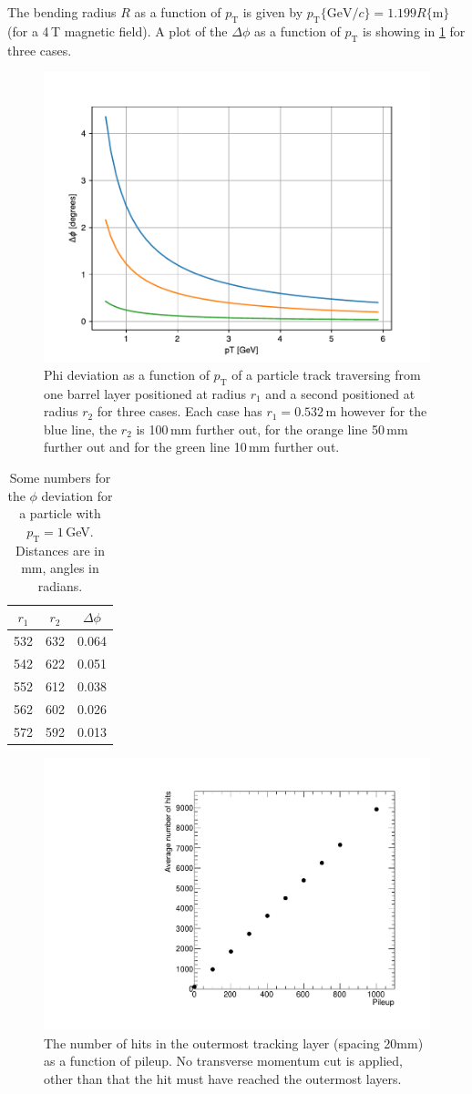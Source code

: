 \documentclass[a4paper, 12pt]{article}
\newcommand{\pt}{\ensuremath{p_{\mathrm{T}}}\xspace}
\begin{document}
The bending radius $R$ as a function of \pt is given by $\pt \{ \mathrm{GeV}/c \} = 1.199 R \{ \mathrm{m} \} $ (for a 4\,T magnetic field).
A plot of the $\Delta \phi$ as a function of \pt is showing in \cref{fig:phiDeviation} for three cases.
\begin{figure}
  \centering
  \includegraphics[width=0.7\linewidth]{images/phiDeviation.pdf}
  \caption{Phi deviation as a function of \pt of a particle track traversing from one barrel layer positioned at radius $r_1$ and a second positioned at radius $r_2$ for three cases. 
  Each case has $r_1 = 0.532$\,m however for the blue line, the $r_2$ is 100\,mm further out, for the orange line 50\,mm further out and for the green line 10\,mm further out.}
  \label{fig:phiDeviation}
\end{figure}

\begin{table}
  \centering
  \begin{tabular}{ccc}
    \toprule
    $r_1$ & $r_2$ & $\Delta \phi$ \\
    \midrule
    532 & 632 & 0.064 \\
    542 & 622 & 0.051 \\
    552 & 612 & 0.038 \\
    562 & 602 & 0.026 \\
    572 & 592 & 0.013 \\
    \bottomrule
  \end{tabular}
  \caption{Some numbers for the $\phi$ deviation for a particle with $\pt = 1$\,GeV.
  Distances are in mm, angles in radians.}
\end{table}



\begin{figure}
  \centering
  \includegraphics[width=0.5\linewidth,angle=-90]{images/pileup_hits}
  \caption{The number of hits in the outermost tracking layer (spacing 20mm) as a function of pileup.
  No transverse momentum cut is applied, other than that the hit must have reached the outermost layers.}
\end{figure}
\end{document}
